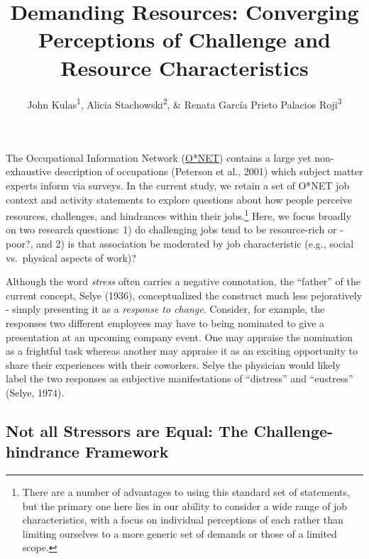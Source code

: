 \documentclass[
  man]{apa6}
\title{Demanding Resources: Converging Perceptions of Challenge and Resource Characteristics}
\author{John Kulas\textsuperscript{1}, Alicia Stachowski\textsuperscript{2}, \& Renata García Prieto Palacios Roji\textsuperscript{3}}
\date{}
\affiliation{\vspace{0.5cm}\textsuperscript{1} eRg\\\textsuperscript{2} University of Wisconsin - Stout\\\textsuperscript{3} PepsiCo}
\begin{document}
\maketitle

The Occupational Information Network (\href{onetonline.org}{O*NET}) contains a large yet non-exhaustive description of occupations (Peterson et al., 2001) which subject matter experts inform via surveys. In the current study, we retain a set of O*NET job context and activity statements to explore questions about how people perceive resources, challenges, and hindrances within their jobs.\footnote{There are a number of advantages to using this standard set of statements, but the primary one here lies in our ability to consider a wide range of job characteristics, with a focus on individual perceptions of each rather than limiting ourselves to a more generic set of demands or those of a limited scope.} Here, we focus broadly on two research questions: 1) do challenging jobs tend to be resource-rich or -poor?, and 2) is that association be moderated by job characteristic (e.g., social vs.~physical aspects of work)?

Although the word \emph{stress} often carries a negative connotation, the ``father'' of the current concept, Selye (1936), conceptualized the construct much less pejoratively - simply presenting it as a \emph{response to change}. Consider, for example, the responses two different employees may have to being nominated to give a presentation at an upcoming company event. One may appraise the nomination as a frightful task whereas another may appraise it as an exciting opportunity to share their experiences with their coworkers. Selye the physician would likely label the two responses as subjective manifestations of ``distress'' and ``eustress'' (Selye, 1974).

\hypertarget{not-all-stressors-are-equal-the-challenge-hindrance-framework}{%
\subsection{Not all Stressors are Equal: The Challenge-hindrance Framework}\label{not-all-stressors-are-equal-the-challenge-hindrance-framework}}
\end{document}
